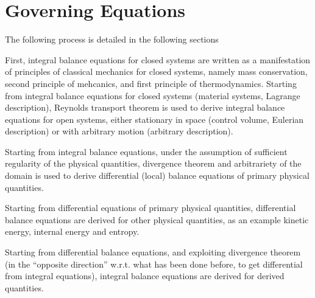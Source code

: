 \documentclass[letterpaper,10pt,english]{jupyterBook}
\begin{document}
\chapter{Governing Equations}
\label{\detokenize{ch/continuum/governing-equations:governing-equations}}\label{\detokenize{ch/continuum/governing-equations:continuum-governing-equations}}\label{\detokenize{ch/continuum/governing-equations::doc}}
\sphinxAtStartPar
The following process is detailed in the following sections

\sphinxAtStartPar
{} First, integral balance equations for closed systems are written as a manifestation of principles of classical mechanics for closed systems, namely mass conservation, second principle of mehcanics, and first principle of thermodynamics. Starting from integral balance equations for closed systems (material systems, Lagrange description), Reynolds transport theorem is used to derive integral balance equations for open systems, either stationary in space (control volume, Eulerian description) or with arbitrary motion (arbitrary description).

\sphinxAtStartPar
{} Starting from integral balance equations, under the assumption of sufficient regularity of the physical quantities, divergence theorem and arbitrariety of the domain is used to derive differential (local) balance equations of primary physical quantities.

\sphinxAtStartPar
{} Starting from differential equations of primary physical quantities, differential balance equations are derived for other physical quantities, as an example kinetic energy, internal energy and entropy.

\sphinxAtStartPar
{} Starting from differential balance equations, and exploiting divergence theorem (in the “opposite direction” w.r.t. what has been done before, to get differential from integral equations), integral balance equations are derived for derived quantities.

\sphinxstepscope
\end{document}
